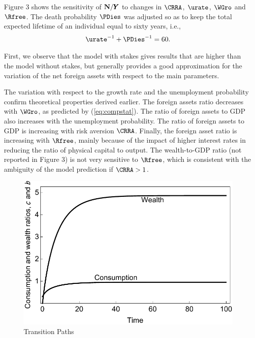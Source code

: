 \documentclass[titlepage]{\econtex}\newcommand{\texname}{cjSOE}
\renewcommand{\GDPLev}{\ensuremath{\pmb{Y}}}
\begin{document}
Figure 3 shows the sensitivity of $\NFALev/\GDPLev$ to changes in $\CRRA$, $\urate$, $\WGro$ and $\Rfree$. The death probability $\PDies$ was adjusted so as to keep the total expected lifetime of an individual equal to sixty years, i.e.,
\begin{eqnarray*}
\urate^{-1}+\PDies^{-1}=60.
\end{eqnarray*}

First, we observe that the model with stakes gives results that are higher than the model without stakes, but generally provides a good approximation for the variation of the net foreign assets with respect to the main parameters.

The variation with respect to the growth rate and the unemployment probability confirm theoretical properties derived earlier. The foreign assets ratio decreases with $\WGro$, as predicted by (\ref{eq:compstat}). The ratio of foreign assets to GDP also increases with the unemployment probability.
The ratio of foreign assets to GDP is increasing with risk aversion $\CRRA$.
Finally, the foreign asset ratio is increasing with $\Rfree$, mainly because of the impact of higher interest rates in reducing the ratio of physical capital to output. The wealth-to-GDP ratio (not reported in Figure 3) is not very sensitive to $\Rfree$, which is consistent with the ambiguity of the model prediction if $\CRRA >1$.

\medskip

\begin{figure}
\includegraphics{./Figures/paths}
\caption{Transition Paths}\label{fig:paths}
\end{figure}
\end{document}
